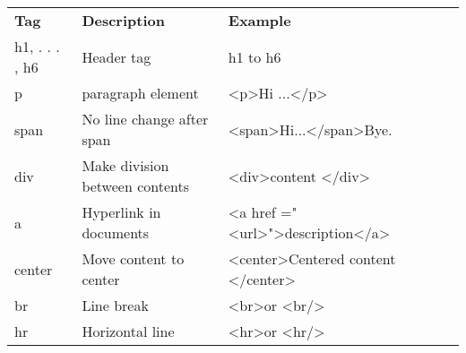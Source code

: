 \begin{itemize}
\begin{table}[]
	\begin{tabular}{|l|l|l|ll}
		\cline{1-3}
		\textbf{Tag}   & \textbf{Description}           & \textbf{Example}                                                                                                                                                               &  &  \\ \cline{1-3}
		h1, . . . , h6 & Header tag                     & h1 to h6                                                                                                                                                                       &  &  \\ \cline{1-3}
		p              & paragraph element              & \textless{}p\textgreater{}Hi ...\textless{}/p\textgreater{}                                                                                                                    &  &  \\ \cline{1-3}
		span           & No line change after span      & \textless{}span\textgreater{}Hi...\textless{}/span\textgreater Bye.                                                                                                            &  &  \\ \cline{1-3}
		div            & Make division between contents & \textless{}div\textgreater content \textless{}/div\textgreater{}                                                                                                               &  &  \\ \cline{1-3}
		a              & Hyperlink in documents         & \textless{}a href ="\textless{}url\textgreater{}"\textgreater{}description\textless{}/a\textgreater{}                                                                          &  &  \\ \cline{1-3}
		center         & Move content to center         & \textless{}center\textgreater{}Centered  content \textless{}/center\textgreater{}                                                                                              &  &  \\ \cline{1-3}
		br             & Line break                     & \textless{}br\textgreater or \textless{}br/\textgreater{}                                                                                                                      &  &  \\ \cline{1-3}
		hr             & Horizontal line                & \textless{}hr\textgreater or \textless{}hr/\textgreater{}                                                                                                                      &  &  \\ \cline{1-3}

\end{tabular}
\end{table}
\end{itemize}

